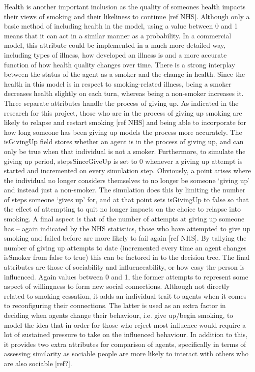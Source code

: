 \documentclass[]{report}
\begin{document}
Health is another important inclusion as the quality of someones health impacts their views of smoking and their likeliness to continue [ref NHS]. Although only a basic method of including health in the model, using a value between 0 and 1 means that it can act in a similar manner as a probability. In a commercial model, this attribute could be implemented in a much more detailed way, including types of illness, how developed an illness is and a more accurate function of how health quality changes over time. There is a strong interplay between the status of the agent as a smoker and the change in health. Since the health in this model is in respect to smoking-related illness, being a smoker decreases health slightly on each turn, whereas being a non-smoker increases it. 
Three separate attributes handle the process of giving up. As indicated in the research for this project, those who are in the process of giving up smoking are likely to relapse and restart smoking [ref NHS] and being able to incorporate for how long someone has been giving up models the process more accurately. The isGivingUp field stores whether an agent is in the process of giving up, and can only be true when that individual is not a smoker. Furthermore, to simulate the giving up period, stepsSinceGiveUp is set to 0 whenever a giving up attempt is started and incremented on every simulation step. Obviously, a point arises where the individual no longer considers themselves to no longer be someone `giving up' and instead just a non-smoker. The simulation does this by limiting the number of steps someone `gives up' for, and at that point sets isGivingUp to false so that the effect of attempting to quit no longer impacts on the choice to relapse into smoking. A final aspect is that of the number of attempts at giving up someone has – again indicated by the NHS statistics, those who have attempted to give up smoking and failed before are more likely to fail again [ref NHS]. By tallying the number of giving up attempts to date (incremented every time an agent changes isSmoker from false to true) this can be factored in to the decision tree.
The final attributes are those of sociability and influenceability, or how easy the person is influenced. Again values between 0 and 1, the former attempts to represent some aspect of willingness to form new social connections. Although not directly related to smoking cessation, it adds an individual trait to agents when it comes to reconfiguring their connections. The latter is used as an extra factor in deciding when agents change their behaviour, i.e. give up/begin smoking, to model the idea that in order for those who reject most influence would require a lot of sustained pressure to take on the influenced behaviour. In addition to this, it provides two extra attributes for comparison of agents, specifically in terms of assessing similarity as sociable people are more likely to interact with others who are also sociable [ref?]. 
\end{document}
